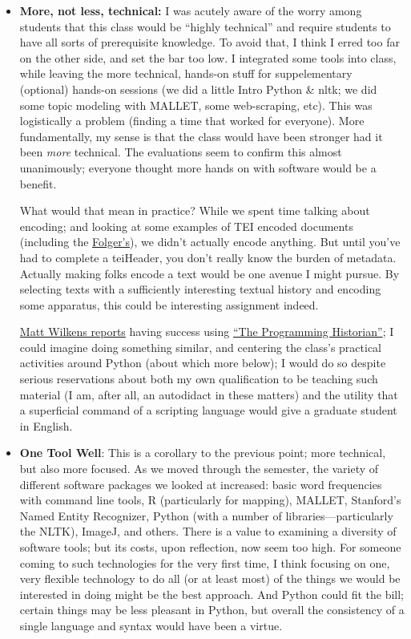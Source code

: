 \documentclass[
  12pt,
]{article}
\begin{document}
\begin{itemize}
\item
  \textbf{More, not less, technical:} I was acutely aware of the worry
  among students that this class would be ``highly technical'' and
  require students to have all sorts of prerequisite knowledge. To avoid
  that, I think I erred too far on the other side, and set the bar too
  low. I integrated some tools into class, while leaving the more
  technical, hands-on stuff for suppelementary (optional) hands-on
  sessions (we did a little Intro Python \& nltk; we did some topic
  modeling with MALLET, some web-scraping, etc). This was logistically a
  problem (finding a time that worked for everyone). More fundamentally,
  my sense is that the class would have been stronger had it been
  \emph{more} technical. The evaluations seem to confirm this almost
  unanimously; everyone thought more hands on with software would be a
  benefit.

  What would that mean in practice? While we spent time talking about
  encoding; and looking at some examples of TEI encoded documents
  (including the \href{http://www.folgerdigitaltexts.org/}{Folger's}),
  we didn't actually encode anything. But until you've had to complete a
  teiHeader, you don't really know the burden of metadata. Actually
  making folks encode a text would be one avenue I might pursue. By
  selecting texts with a sufficiently interesting textual history and
  encoding some apparatus, this could be interesting assignment indeed.

  \href{http://mattwilkens.com/2012/12/31/dh-grad-course-reflections/}{Matt
  Wilkens reports} having success using
  \href{http://programminghistorian.org/lessons}{``The Programming
  Historian''}; I could imagine doing something similar, and centering
  the class's practical activities around Python (about which more
  below); I would do so despite serious reservations about both my own
  qualification to be teaching such material (I am, after all, an
  autodidact in these matters) and the utility that a superficial
  command of a scripting language would give a graduate student in
  English.
\item
  \textbf{One Tool Well}: This is a corollary to the previous point;
  more technical, but also more focused. As we moved through the
  semester, the variety of different software packages we looked at
  increased: basic word frequencies with command line tools, R
  (particularly for mapping), MALLET, Stanford's Named Entity
  Recognizer, Python (with a number of libraries---particularly the
  NLTK), ImageJ, and others. There is a value to examining a diversity
  of software tools; but its costs, upon reflection, now seem too high.
  For someone coming to such technologies for the very first time, I
  think focusing on one, very flexible technology to do all (or at least
  most) of the things we would be interested in doing might be the best
  approach. And Python could fit the bill; certain things may be less
  pleasant in Python, but overall the consistency of a single language
  and syntax would have been a virtue.


\end{itemize}
\end{document}
